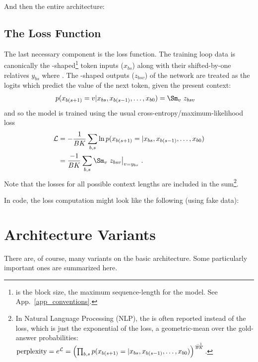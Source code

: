 \documentclass[11pt]{article}
\begin{document}
And then the entire architecture: 


\subsection{The Loss Function}

The last necessary component is the loss function. The training loop data is canonically the
-shaped\footnote{ is the block size, the maximum sequence-length for
	the model. See App.~\ref{app_conventions}.}  token inputs ($ x _{ bs } $) along with their shifted-by-one relatives $ y
		_{ bs }$ where .  The -shaped
outputs ($ z _{ bsv } $)  of the  network are treated as the logits which
predict the value of the next token, given the present context:
\begin{align}
	p(x _{ b (s+1) }=v| x _{ b s }, x _{ b (s-1) }, \ldots, x _{ b 0 }) & = \Sm _{ v }\ z _{ bsv
		}\label{eq_transformer_conditional_prob}
\end{align}
and so the model is trained using the usual cross-entropy/maximum-likelihood loss
\begin{align}
	\Lcal & = -\frac{ 1 }{ BK }\sum _{ b,s }\ln p(x _{ b (s+1) }=| x _{ b s }, x _{ b (s-1) },
	\ldots, x _{ b 0 })\nn
	      & = \frac{- 1 }{ BK }\sum _{ b,s }\Sm _{ v }\ z _{ bsv}\big| _{ v=y _{ bs } } \ .
\end{align}
Note that the losses for all possible context lengths are included in the sum\footnote{In Natural Language Processing (NLP),
	the  is often reported instead of the loss, which is just the exponential of the loss, a geometric-mean over the
	gold-answer probabilities: $ {\rm perplexity} = e^{ \mathcal{L} } =\left (\prod _{ b, s }p(x _{ b (s+1) }=| x _{ b s }, x _{ b (s-1) },
		\ldots, x _{ b 0 })\right ) ^{ \frac{ -1 }{ BK } }$.}.

In 
code, the loss computation might look like the following (using fake data):


\section{Architecture Variants}

There are, of course, many variants on the basic architecture. Some particularly important ones are
summarized here.
\end{document}
